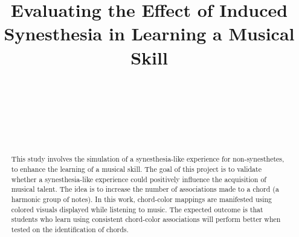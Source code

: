 \documentclass{sigchi}
\def\plaintitle{Evaluating the Effect of Induced Synesthesia in Learning a Musical Skill}
\begin{document}
\title{\plaintitle}

\author{%
\\
  \\
  \\
  \\
  \\
}

\maketitle

\begin{abstract}
	This study involves the simulation of a synesthesia-like experience for non-synesthetes, to enhance the learning of a musical skill. The goal of this project is to validate whether a synesthesia-like experience could positively influence the acquisition of musical talent. The idea is to increase the number of associations made to a chord (a harmonic group of notes). In this work, chord-color mappings are manifested using colored visuals displayed while listening to music. The expected outcome is that students who learn using consistent chord-color associations will perform better when tested on the identification of chords.
\end{abstract}
\end{document}
